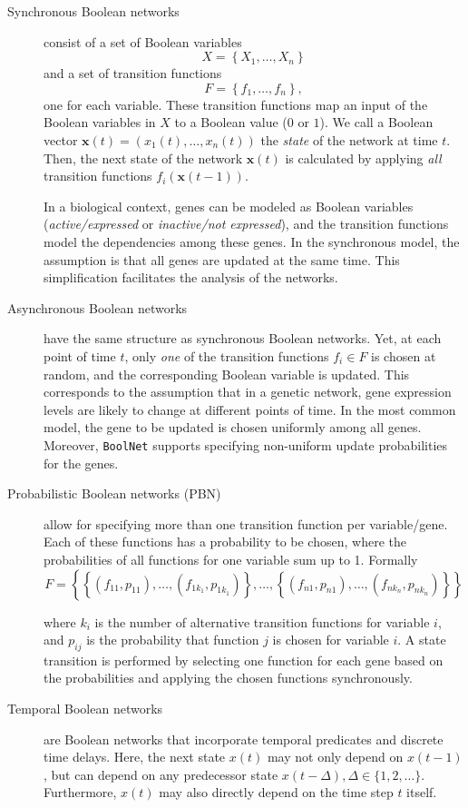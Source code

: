 \documentclass[a4paper]{article}
\begin{document}
\begin{description}
\item[Synchronous Boolean networks]{ consist of a set of Boolean variables 
\[
X = \left\{X_1, \ldots, X_n \right\} 
\]
and a set of transition functions 
\[
F=\left\{ f_{1},\ldots,f_{n}\right\},
\] 
one for each variable. These transition functions map an input of the Boolean variables in $X$ to a Boolean value ($0$ or $1$). We call a Boolean vector $\mathbf{x}(t) = \left(x_1(t), \ldots, x_n(t) \right)$ the {\em state} of the network at time $t$. Then, the next state of the network  $\mathbf{x}(t)$ is calculated by applying {\em all} transition functions $f_i(\mathbf{x}(t-1))$.

In a biological context, genes can be modeled as Boolean variables ({\em active/expressed} or {\em inactive/not expressed}), and the transition functions model the dependencies among these genes. In the synchronous model, the assumption is that all genes are updated at the same time. This simplification facilitates the analysis of the networks.}

\item[Asynchronous Boolean networks]{ have the same structure as synchronous Boolean networks. Yet, at each point of time $t$, only {\em one} of the transition functions $f_i \in F$ is chosen at random, and the corresponding Boolean variable is updated. This corresponds to the assumption that in a genetic network, gene expression levels are likely to change at different points of time. In the most common model, the gene to be updated is chosen uniformly among all genes. Moreover, \texttt{BoolNet} supports specifying non-uniform update probabilities for the genes.}

\item[Probabilistic Boolean networks (PBN)]{ allow for specifying more than one transition function per variable/gene. Each of these functions has a probability to be chosen, where the probabilities of all functions for one variable sum up to 1. Formally
\[
F=\left\{\left\{\left(f_{11}, p_{11}\right), \ldots, \left(f_{1k_1}, p_{1k_1}\right)\right\}, \ldots,  \left\{\left(f_{n1}, p_{n1}\right), \ldots, \left(f_{nk_n}, p_{nk_n}\right)\right\}\right\}
\]

where $k_i$ is the number of alternative transition functions for variable $i$, and $p_{ij}$ is the probability that function $j$ is chosen for variable $i$. A state transition is performed by selecting one function for each gene based on the probabilities and applying the chosen functions synchronously.}

\item[Temporal Boolean networks]{ are Boolean networks that incorporate temporal predicates and discrete time delays. Here, the next state $x(t)$ may not only depend on $x(t-1)$, but can depend on any predecessor state $x(t - \Delta), \Delta \in \{1, 2, \ldots\}$. Furthermore, $x(t)$ may also directly depend on the time step $t$ itself.
}

\end{description}
\end{document}
